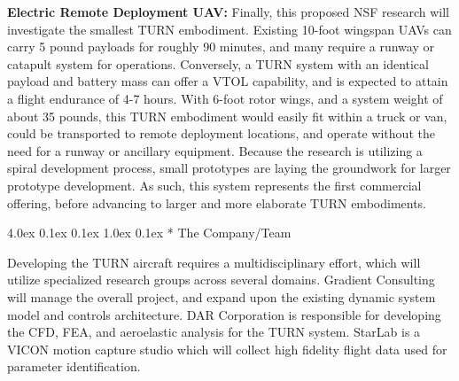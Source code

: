 \documentclass[11pt]{article}
\makeatletter
\renewcommand\section{
\@startsection{section}{1}{\z@}%
{4.0ex \@plus 0.1ex \@minus 0.1ex}%
{1.0ex \@plus 0.1ex}%
{\normalfont\LARGE\bfseries}}
\makeatother
\begin{document}
{\color{green} \bf Electric Remote Deployment UAV:}
Finally, this proposed NSF research will investigate the smallest TURN embodiment.  Existing 10-foot wingspan UAVs can carry 5 pound payloads for roughly 90 minutes, and many require a runway or catapult system for operations.  Conversely, a TURN system with an identical payload and battery mass can offer a VTOL capability, and is expected to attain a flight endurance of 4-7 hours.  With 6-foot rotor wings, and a system weight of about 35 pounds, this TURN embodiment would easily fit within a truck or van, could be transported to remote deployment locations, and operate without the need for a runway or ancillary equipment.  Because the research is utilizing a spiral development process, small prototypes are laying the groundwork for larger prototype development.  As such, this system represents the first commercial offering, before advancing to larger and more elaborate TURN embodiments.








\section*{\color{green} The Company/Team}  %

Developing the TURN aircraft requires a multidisciplinary effort, which will utilize specialized research groups across several domains.  Gradient Consulting will manage the overall project, and expand upon the existing dynamic system model and controls architecture.  DAR Corporation is responsible for developing the CFD, FEA, and aeroelastic analysis for the TURN system.  StarLab is a VICON motion capture studio which will collect high fidelity flight data used for parameter identification.
\end{document}
